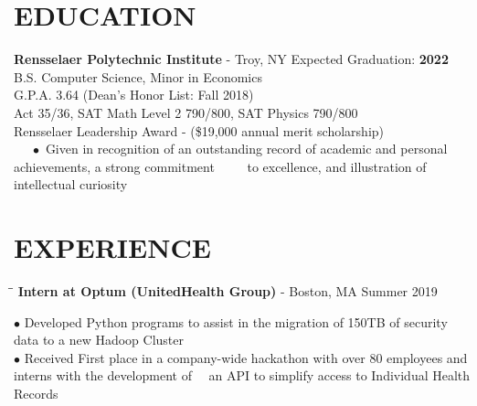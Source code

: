 \documentclass{res}
\begin{document}

\address{\bf  ADDRESS\\11 Riverside Drive Apt. 7WE\\New York, NY 10023}
\address{\bf Contact Info \\ eli@elischiff.org \\   (646) 574-5224}

\begin{resume}

\vspace{-0.1in}
\section{EDUCATION}
    {\bf Rensselaer Polytechnic Institute} - Troy, NY \hfill Expected Graduation: {\bf 2022} \\
    B.S. Computer Science,
    Minor in Economics  \\
    G.P.A. 3.64 (Dean's Honor List: Fall 2018)\\
    Act 35/36, SAT Math Level 2 790/800, SAT Physics 790/800\\
    Rensselaer Leadership Award - (\$19,000 annual merit scholarship)\\
    $~~~~~~\bullet$ Given in recognition of an outstanding record of academic and personal achievements, a strong
	commitment $~~~~~~~~~~$to excellence, and illustration of intellectual curiosity

\vspace{-0.1in}
\section{EXPERIENCE}
   \vspace{-0.1in}
   \begin{tabbing}
   \hspace{2.3in}\= \hspace{3.8in}\= \kill
    {\bf Intern at Optum (UnitedHealth Group)} - Boston, MA   \>  \>Summer 2019
   \end{tabbing}\vspace{-20pt}
    $\bullet$ Developed Python programs to assist in the migration of 150TB of security data to a new Hadoop Cluster\\
    $\bullet$ Received First place in a company-wide hackathon with over 80 employees and interns with the development of $~~~$ an API to simplify access to Individual Health Records
    \vspace{-15pt}


\end{resume}
\end{document}
